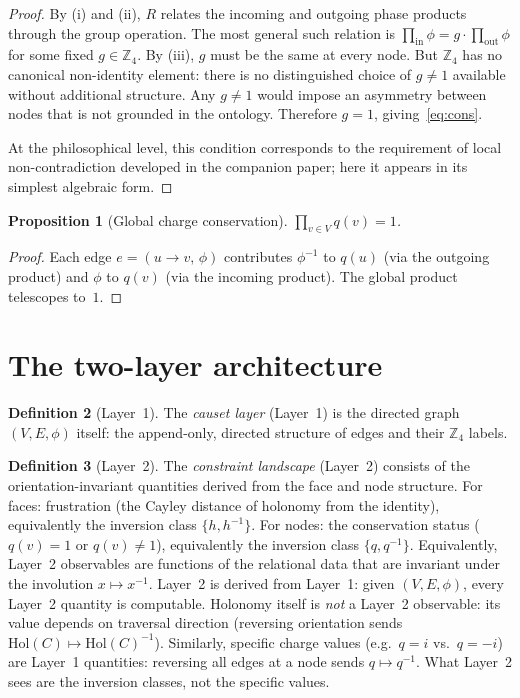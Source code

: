\documentclass[11pt,a4paper]{article}
\theoremstyle{definition}
\newtheorem{definition}{Definition}[section]
\theoremstyle{plain}
\newtheorem{proposition}[definition]{Proposition}
\theoremstyle{remark}
\newcommand{\Zf}{\mathbb{Z}_4}
\newcommand{\inp}{\mathrm{in}}
\newcommand{\out}{\mathrm{out}}
\newcommand{\Hol}{\mathrm{Hol}}
\begin{document}
\begin{proof}
  By (i) and (ii), $R$ relates the incoming and outgoing phase products through the group operation.  The most general such relation is $\prod_{\inp} \phi = g \cdot \prod_{\out} \phi$ for some fixed $g \in \Zf$.  By (iii), $g$ must be the same at every node.  But $\Zf$ has no canonical non-identity element: there is no distinguished choice of $g \neq 1$ available without additional structure.  Any $g \neq 1$ would impose an asymmetry between nodes that is not grounded in the ontology.  Therefore $g = 1$, giving~\eqref{eq:cons}.

  At the philosophical level, this condition corresponds to the requirement of local non-contradiction developed in the companion paper; here it appears in its simplest algebraic form.
\end{proof}

\begin{proposition}[Global charge conservation]\label{prop:globalcharge}
  $\prod_{v \in V} q(v) = 1$.
\end{proposition}

\begin{proof}
  Each edge $e = (u \to v,\, \phi)$ contributes $\phi^{-1}$ to $q(u)$ (via the outgoing product) and $\phi$ to $q(v)$ (via the incoming product).  The global product telescopes to~$1$.
\end{proof}

\section{The two-layer architecture}\label{sec:layers}

\begin{definition}[Layer~1]\label{def:L1}
  The \emph{causet layer} (Layer~1) is the directed graph $(V, E, \phi)$ itself: the append-only, directed structure of edges and their $\Zf$ labels.
\end{definition}

\begin{definition}[Layer~2]\label{def:L2}
  The \emph{constraint landscape} (Layer~2) consists of the orientation-invariant quantities derived from the face and node structure.  For faces: frustration (the Cayley distance of holonomy from the identity), equivalently the inversion class $\{h, h^{-1}\}$.  For nodes: the conservation status ($q(v) = 1$ or $q(v) \neq 1$), equivalently the inversion class $\{q, q^{-1}\}$.  Equivalently, Layer~2 observables are functions of the relational data that are invariant under the involution $x \mapsto x^{-1}$.  Layer~2 is derived from Layer~1: given $(V, E, \phi)$, every Layer~2 quantity is computable.  Holonomy itself is \emph{not} a Layer~2 observable: its value depends on traversal direction (reversing orientation sends $\Hol(C) \mapsto \Hol(C)^{-1}$).  Similarly, specific charge values (e.g.\ $q = i$ vs.\ $q = -i$) are Layer~1 quantities: reversing all edges at a node sends $q \mapsto q^{-1}$.  What Layer~2 sees are the inversion classes, not the specific values.
\end{definition}
\end{document}
